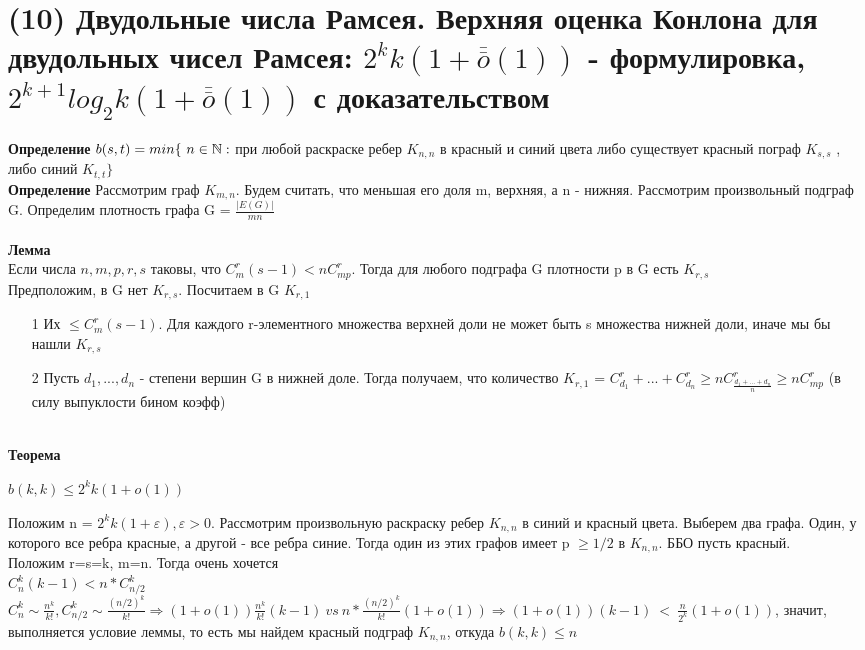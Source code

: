 \section{(10) Двудольные числа Рамсея. Верхняя оценка Конлона для двудольных чисел Рамсея: $2
^k k(1+\overline{\overline{o}}(1))$
- формулировка, $2
^{k+1} log_2 k(1 + \overline{\overline{o}}(1))$ с доказательством}
\textbf{Определение} $b(s,t) = min\{\ n \in \mathbb{N}: $ при любой раскраске ребер $K_{n,n}$ в красный и синий цвета либо существует красный пограф $K_{s,s}$ , либо синий  $K_{t,t}\}$
\\
\textbf{Определение} Рассмотрим граф $K_{m,n}$. Будем считать, что меньшая его доля m, верхняя, а n - нижняя. Рассмотрим произвольный подграф G. Определим плотность графа G = $\frac{|E(G)|}{mn}$
\\
\\
\textbf{Лемма}
\\
Если числа $n,m,p,r,s$ таковы, что $C_m^r(s-1) < nC_{mp}^r$. Тогда для любого подграфа G плотности p в G есть $K_{r,s}$
\\
\Proof
Предположим, в G нет $K_{r,s}$. Посчитаем в G $K_{r,1}$
\begin{itemize}
    \item [1] Их $\leqslant C_m^r(s-1)$. Для каждого r-элементного множества верхней доли не может быть s множества нижней доли, иначе мы бы нашли  $K_{r,s}$ 
    \item [2] Пусть $d_1, ..., d_n$ - степени вершин G в нижней доле. Тогда получаем, что количество $K_{r,1}$ = $C_{d_1}^r + ... + C_{d_n}^r \geqslant nC_{\frac{d_1 + ... + d_n}{n}}^r \geqslant nC_{mp}^r$  (в силу выпуклости бином коэфф)
\end{itemize}
\EndProof
\\
\textbf{Теорема}
\begin{center}
    $b(k,k) \leq 2^kk(1+o(1))$
\end{center}
\Proof Положим n = $2^kk(1+\varepsilon), \varepsilon > 0$. Рассмотрим произвольную раскраску ребер  $K_{n,n}$ в синий и красный цвета. Выберем два графа. Один, у которого все ребра красные, а другой - все ребра синие. Тогда один из этих графов имеет p $\geq 1/2$ в $K_{n,n}$. ББО пусть красный.
\\
Положим r=s=k, m=n. Тогда очень хочется\\
$C_n^k(k-1) < n*C_{n/2}^k$
\\
$C_n^k \sim \frac{n^k}{k!}, C_{n/2}^k \sim \frac{(n/2)^k}{k!} \Longrightarrow (1 +o(1)) \frac{n^k}{k!}(k-1) \ vs\  n* \frac{(n/2)^k}{k!} (1 +o(1))  \Longrightarrow  (1 +o(1))(k-1) \ < \ \frac{n}{2^k}(1+o(1))$, значит, выполняется условие леммы, то есть мы найдем красный подграф $K_{n,n}$, откуда $b(k,k) \leq n$
